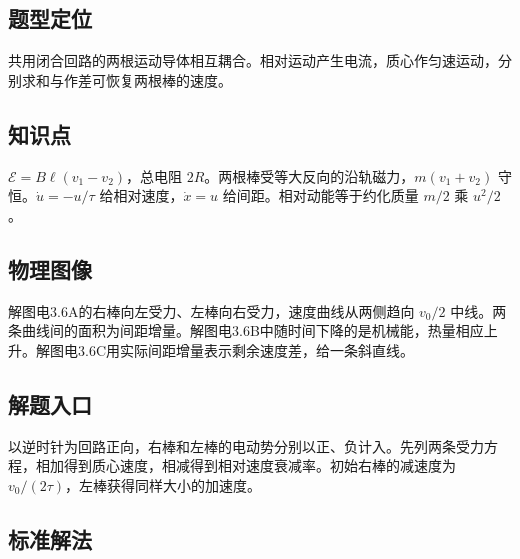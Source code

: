 \documentclass[UTF8,fontset=fandol,a4paper,11pt]{ctexart}
\begin{document}


\subsection*{题型定位}

共用闭合回路的两根运动导体相互耦合。相对运动产生电流，质心作匀速运动，分别求和与作差可恢复两根棒的速度。



\subsection*{知识点}

$\mathcal E=B\ell(v_1-v_2)$，总电阻 $2R$。两根棒受等大反向的沿轨磁力，$m(v_1+v_2)$ 守恒。$\dot u=-u/\tau$ 给相对速度，$\dot x=u$ 给间距。相对动能等于约化质量 $m/2$ 乘 $u^2/2$。



\subsection*{物理图像}

解图电3.6A的右棒向左受力、左棒向右受力，速度曲线从两侧趋向 $v_0/2$ 中线。两条曲线间的面积为间距增量。解图电3.6B中随时间下降的是机械能，热量相应上升。解图电3.6C用实际间距增量表示剩余速度差，给一条斜直线。



\subsection*{解题入口}

以逆时针为回路正向，右棒和左棒的电动势分别以正、负计入。先列两条受力方程，相加得到质心速度，相减得到相对速度衰减率。初始右棒的减速度为 $v_0/(2\tau)$，左棒获得同样大小的加速度。


\subsection*{标准解法}
\end{document}
